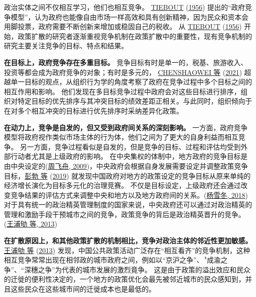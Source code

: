 \documentclass[
  12pt,
]{ctexart}
\begin{document}
政治实体之间不仅相互学习，他们也相互竞争。 \protect\hyperlink{ref-Tiebout1956}{TIEBOUT} (\protect\hyperlink{ref-Tiebout1956}{1956}) 提出的``政府竞争模型''，认为政府也能像自由市场一样高效和具有创新精神，因为民众和资本会用脚投票，政府需要不断创新来增加或稳固自己的税收。
从 \protect\hyperlink{ref-Tiebout1956}{TIEBOUT} (\protect\hyperlink{ref-Tiebout1956}{1956}) 开始，政策扩散的研究者逐渐重视竞争机制在政策扩散中的重要性，现有竞争机制的研究主要关注竞争的目标、特点和结果。

\textbf{在目标上，政府竞争存在多重目标。}
竞争目标有时是单一的，税基、旅游收入、投资等都会成为政府竞争的对象；有时是多元的， \protect\hyperlink{ref-ChenShaoweiJiaKai2021}{CHENSHAOWEI 等} (\protect\hyperlink{ref-ChenShaoweiJiaKai2021}{2021}) 超越单一目标的观点，从组织行为学的角度考察了政府在竞争过程中多个目标之间的相互作用和影响。
他们发现在多目标竞争过程中政府会对这些目标进行排序，组织对特定目标的优先排序与其冲突目标的绩效差距正相关。与此同时，组织倾向于在对多个相互冲突的目标进行优先排序时采纳差异化政策。

\textbf{在动力上，竞争是自发的，但又受到政府间关系的深刻影响。}
一方面，政府竞争模型将政府视作类似市场主体的行为体，他们之间为了更大的自身利益而相互竞争。
另一方面，竞争过程看似是自发的，但是竞争的目标、过程和评估均受到外部行动者尤其是上级政府的影响。
在中央集权的体制中，地方政府的竞争目标是由中央设定的(\protect\hyperlink{ref-ZhouFeiZhou2009a}{周飞舟, 2009})，中央政府会根据自身发展需要设定并调整政策竞争目标，\protect\hyperlink{ref-PengBoZhaoJi2019a}{彭勃 等} (\protect\hyperlink{ref-PengBoZhaoJi2019a}{2019}) 就发现中国政府对地方的政策设定的竞争目标从原来单纯的经济增长演化为目标多元化的治理竞赛。
不仅是目标设定，上级政府还会通过改变竞争结果的评估方式来调整中央和地方以及地方政府间的关系。(\protect\hyperlink{ref-YangXueDong2018a}{杨雪冬, 2018})
对于具有统一的政治精英管理制度的国家来说，中央政府还可以通过对政治精英的管理和激励手段干预城市之间的竞争，政策竞争的背后是政治精英晋升的竞争。(\protect\hyperlink{ref-WangPuQuLaiXianJin2013}{王浦劬 等, 2013})

\textbf{在扩散原因上，和其他政策扩散的机制相比，竞争对政治主体的邻近性更加敏感。}
\protect\hyperlink{ref-WangPuQuLaiXianJin2013}{王浦劬 等} (\protect\hyperlink{ref-WangPuQuLaiXianJin2013}{2013}) 发现，中国公共政策活动广泛存在``相互看齐''的竞争机制，这种相互竞争常常出现在相邻政的城市政府之间，例如以``京沪之争''、〝成渝之争''、``深穗之争''为代表的城市发展的激烈竟争。
这是由于政策的溢出效应和民众的迁徙的便利性决定的，一个地方的政策优化会最先被邻近城市的民众感知到，并且这些民众在这些城市间的迁徙成本也是最低的。
\end{document}
